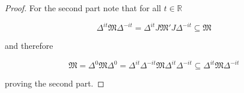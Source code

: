 \begin{proof}
For the second part note that for all $t\in\mathbb{R}$

\begin{equation}
\Delta^{it}\mathfrak{M}\Delta^{-it}=\Delta^{it}J\mathfrak{M}'J\Delta^{-it}\subseteq\mathfrak{M}
\end{equation}

and therefore

\begin{equation}
\mathfrak{M}=\Delta^0\mathfrak{M}\Delta^0=\Delta^{it}\Delta^{-it}\mathfrak{M}\Delta^{it}\Delta^{-it}\subseteq \Delta^{it}\mathfrak{M}\Delta^{-it}
\end{equation}

proving the second part.

\end{proof}

 